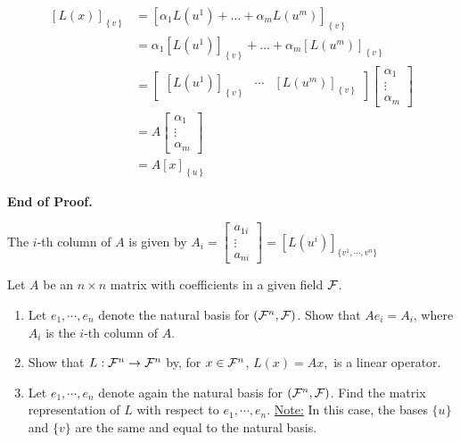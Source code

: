 \documentclass[11pt,twoside]{nsf_jwg} %
\begin{document}
 \begin{align*}
\left[L\left(x\right)\right]_{\left\{ v\right\} } & =\left[\alpha_{1}L\left(u^{1}\right)+\ldots+\alpha_{m}L\left(u^{m}\right)\right]_{\left\{ v\right\} }\\
 & =\alpha_{1}\left[L\left(u^{1}\right)\right]_{\left\{ v\right\} }+\ldots+\alpha_{m}\left[L\left(u^{m}\right)\right]_{\left\{ v\right\} }\\
 & =\left[\begin{array}{ccc}
\left[L\left(u^{1}\right)\right]_{\left\{ v\right\} } & \cdots & \left[L\left(u^{m}\right)\right]_{\left\{ v\right\} }\end{array}\right]\left[\begin{array}{c}
\alpha_{1}\\
\vdots\\
\alpha_{m}
\end{array}\right]\\
 & =A\left[\begin{array}{c}
\alpha_{1}\\
\vdots\\
\alpha_{m}
\end{array}\right]\\
 & =A\left[x\right]_{\left\{ u\right\} } \end{align*}
\begin{flushright}
 {\bf End of Proof.}
\end{flushright}

\vspace*{.3in}

 The
$i$-th column of $A$ is given by $A_i =  \left[ \begin{array}{c}
a_{1i} \\ \vdots \\ a_{ni} \end{array} \right]= \left[ L(u^i) \right]_{ \{v^1,\cdots,v^n \} }$


\newpage

 Let $A$ be an  $n \times n$ matrix with coefficients in a given field ${\cal F}$.\\
\begin{enumerate}

\item Let $e_1, \cdots, e_n$ denote the natural basis for $({\cal F}^n,  {\cal F})$. Show that $A e_i = A_i$, where $A_i$ is the $i$-th column of $A$.

\item Show that $L: {\cal F}^n \to {\cal F}^n$ by, for $x \in {\cal F}^n$, $L(x) = A x,$ is a linear operator.

\item Let $e_1, \cdots, e_n$ denote again the natural basis for $({\cal F}^n,  {\cal F})$. Find the matrix representation of $L$ with respect to  $e_1, \cdots, e_n$. \underline{Note:} In this case, the bases $\{u\}$ and $\{ v \}$ are the same and equal to the natural basis.

\end{enumerate}
\end{document}
